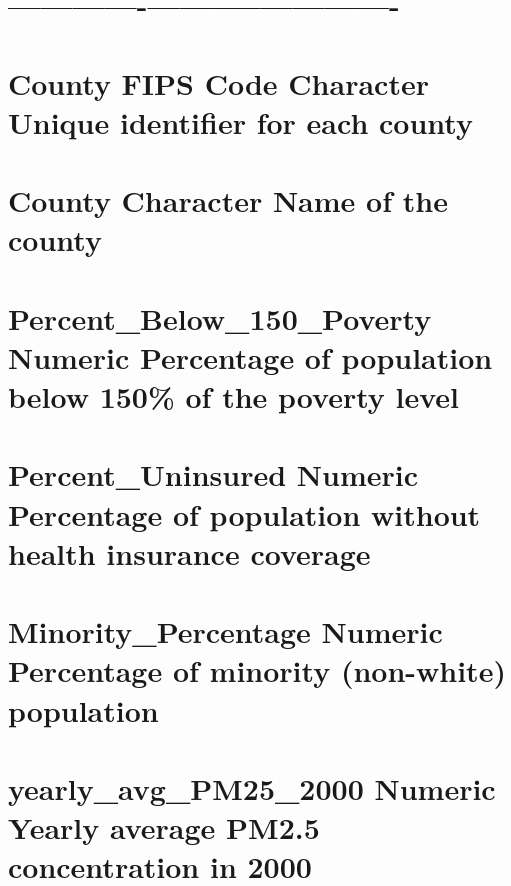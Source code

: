 \documentclass[
]{article}
\begin{document}
\section{\textbar-------------\textbar-----------\textbar-------------\textbar{}}\label{section}

\section{\textbar{} County FIPS Code \textbar{} Character \textbar{}
Unique identifier for each county
\textbar{}}\label{county-fips-code-character-unique-identifier-for-each-county}

\section{\textbar{} County \textbar{} Character \textbar{} Name of the
county \textbar{}}\label{county-character-name-of-the-county}

\section{\textbar{} Percent\_Below\_150\_Poverty \textbar{} Numeric
\textbar{} Percentage of population below 150\% of the poverty level
\textbar{}}\label{percent_below_150_poverty-numeric-percentage-of-population-below-150-of-the-poverty-level}

\section{\textbar{} Percent\_Uninsured \textbar{} Numeric \textbar{}
Percentage of population without health insurance coverage
\textbar{}}\label{percent_uninsured-numeric-percentage-of-population-without-health-insurance-coverage}

\section{\textbar{} Minority\_Percentage \textbar{} Numeric \textbar{}
Percentage of minority (non-white) population
\textbar{}}\label{minority_percentage-numeric-percentage-of-minority-non-white-population}

\section{\textbar{} yearly\_avg\_PM25\_2000 \textbar{} Numeric
\textbar{} Yearly average PM2.5 concentration in 2000
\textbar{}}\label{yearly_avg_pm25_2000-numeric-yearly-average-pm2.5-concentration-in-2000}
\end{document}
